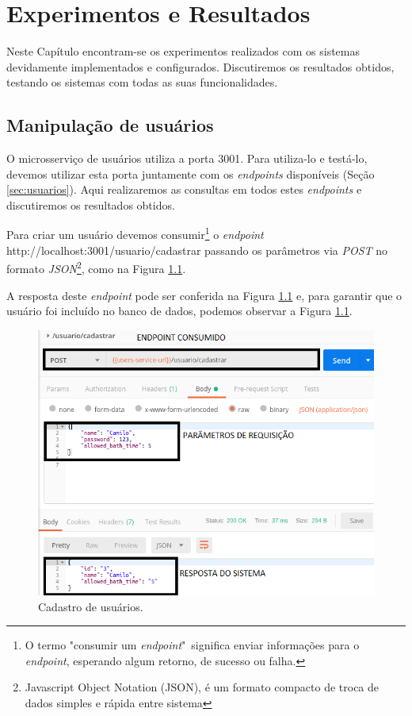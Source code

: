 \chapter{Experimentos e Resultados}

Neste Capítulo encontram-se os experimentos realizados com os sistemas devidamente implementados e configurados. Discutiremos os resultados obtidos, testando os sistemas com todas as suas funcionalidades.

\section{Manipulação de usuários}

O microsserviço de usuários utiliza a porta 3001. Para utiliza-lo e testá-lo, devemos utilizar esta porta juntamente com os \textit{endpoints} disponíveis (Seção \ref{sec:usuarios}). Aqui realizaremos as consultas em todos estes \textit{endpoints} e discutiremos os resultados obtidos.

Para criar um usuário devemos consumir\footnote{O termo "consumir um \textit{endpoint}"\  significa enviar informações para o \textit{endpoint}, esperando algum retorno, de sucesso ou falha.} o \textit{endpoint} http://localhost:3001/usuario/cadastrar passando os parâmetros via \textit{POST} no formato \textit{JSON}\footnote{Javascript Object Notation (JSON), é um formato compacto de troca de dados simples e rápida entre sistema}, como na Figura \ref{fig:cadastro}.

A resposta deste \textit{endpoint} pode ser conferida na Figura \ref{fig:cadastro} e, para garantir que o usuário foi incluído no banco de dados, podemos observar a Figura \ref{fig:cadastro}.

\begin{figure}[htbp]
	\centering
	\includegraphics[width=0.7\linewidth]{figuras/postman/cadastro.png}
	\caption{Cadastro de usuários.}
	\label{fig:cadastro}
\end{figure}

